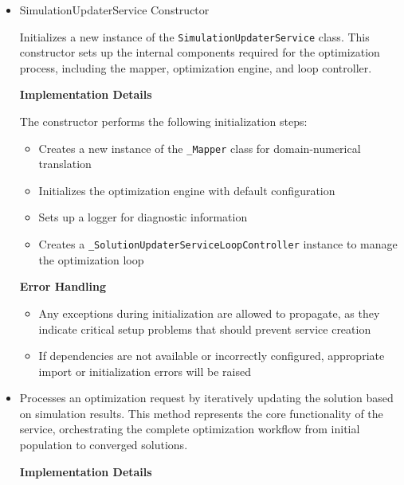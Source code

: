\begin{itemize}
	\item SimulationUpdaterService Constructor

	Initializes a new instance of the \texttt{SimulationUpdaterService} class. This constructor sets up the internal components required for the optimization process, including the mapper, optimization engine, and loop controller.

	\textbf{Implementation Details}

	The constructor performs the following initialization steps:
	\begin{itemize}
		\item Creates a new instance of the \texttt{\_Mapper} class for domain-numerical translation
		\item Initializes the optimization engine with default configuration
		\item Sets up a logger for diagnostic information
		\item Creates a \texttt{\_SolutionUpdaterServiceLoopController} instance to manage the optimization loop
	\end{itemize}

	\textbf{Error Handling}
	\begin{itemize}
		\item Any exceptions during initialization are allowed to propagate, as they indicate critical setup problems that should prevent service creation
		\item If dependencies are not available or incorrectly configured, appropriate import or initialization errors will be raised
	\end{itemize}

	\item {}

	Processes an optimization request by iteratively updating the solution based on simulation results. This method represents the core functionality of the service, orchestrating the complete optimization workflow from initial population to converged solutions.

	\textbf{Implementation Details}


\end{itemize}
